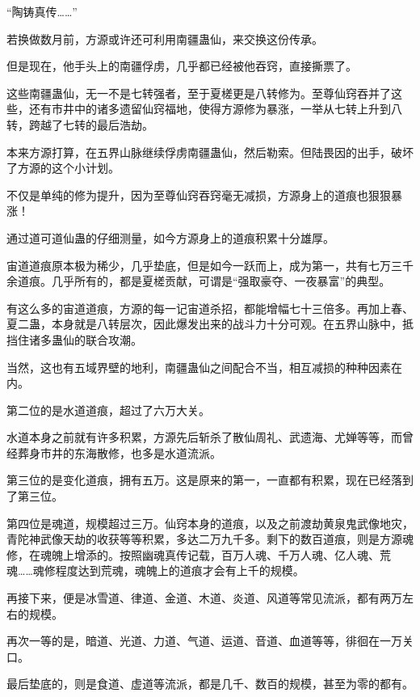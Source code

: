 
\begin{this_body}



“陶铸真传……”

若换做数月前，方源或许还可利用南疆蛊仙，来交换这份传承。

但是现在，他手头上的南疆俘虏，几乎都已经被他吞窍，直接撕票了。

这些南疆蛊仙，无一不是七转强者，至于夏槎更是八转修为。至尊仙窍吞并了这些，还有市井中的诸多遗留仙窍福地，使得方源修为暴涨，一举从七转上升到八转，跨越了七转的最后浩劫。

本来方源打算，在五界山脉继续俘虏南疆蛊仙，然后勒索。但陆畏因的出手，破坏了方源的这个小计划。

不仅是单纯的修为提升，因为至尊仙窍吞窍毫无减损，方源身上的道痕也狠狠暴涨！

通过道可道仙蛊的仔细测量，如今方源身上的道痕积累十分雄厚。

宙道道痕原本极为稀少，几乎垫底，但是如今一跃而上，成为第一，共有七万三千余道痕。几乎所有的，都是夏槎贡献，可谓是“强取豪夺、一夜暴富”的典型。

有这么多的宙道道痕，方源的每一记宙道杀招，都能增幅七十三倍多。再加上春、夏二蛊，本身就是八转层次，因此爆发出来的战斗力十分可观。在五界山脉中，抵挡住诸多蛊仙的联合攻潮。

当然，这也有五域界壁的地利，南疆蛊仙之间配合不当，相互减损的种种因素在内。

第二位的是水道道痕，超过了六万大关。

水道本身之前就有许多积累，方源先后斩杀了散仙周礼、武遗海、尤婵等等，而曾经葬身市井的东海散修，也多是水道流派。

第三位的是变化道痕，拥有五万。这是原来的第一，一直都有积累，现在已经落到了第三位。

第四位是魂道，规模超过三万。仙窍本身的道痕，以及之前渡劫黄泉鬼武像地灾，青陀神武像天劫的收获等等积累，多达二万九千多。剩下的数百道痕，则是方源魂修，在魂魄上增添的。按照幽魂真传记载，百万人魂、千万人魂、亿人魂、荒魂……魂修程度达到荒魂，魂魄上的道痕才会有上千的规模。

再接下来，便是冰雪道、律道、金道、木道、炎道、风道等常见流派，都有两万左右的规模。

再次一等的是，暗道、光道、力道、气道、运道、音道、血道等等，徘徊在一万关口。

最后垫底的，则是食道、虚道等流派，都是几千、数百的规模，甚至为零的都有。


\end{this_body}

